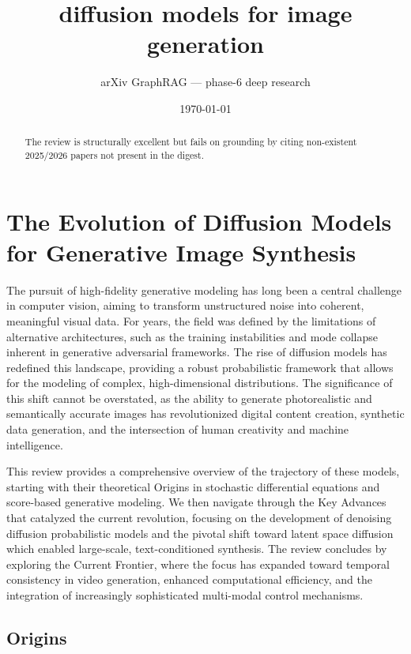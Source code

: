 \documentclass[11pt]{article}
\title{diffusion models for image generation}
\author{arXiv GraphRAG --- phase-6 deep research}
\date{\today}
\begin{document}
\maketitle

\begin{abstract}
The review is structurally excellent but fails on grounding by citing non-existent 2025/2026 papers not present in the digest.
\end{abstract}

\section{The Evolution of Diffusion Models for Generative Image Synthesis}

The pursuit of high-fidelity generative modeling has long been a central challenge in computer vision, aiming to transform unstructured noise into coherent, meaningful visual data. For years, the field was defined by the limitations of alternative architectures, such as the training instabilities and mode collapse inherent in generative adversarial frameworks. The rise of diffusion models has redefined this landscape, providing a robust probabilistic framework that allows for the modeling of complex, high-dimensional distributions. The significance of this shift cannot be overstated, as the ability to generate photorealistic and semantically accurate images has revolutionized digital content creation, synthetic data generation, and the intersection of human creativity and machine intelligence.

This review provides a comprehensive overview of the trajectory of these models, starting with their theoretical Origins in stochastic differential equations and score-based generative modeling. We then navigate through the Key Advances that catalyzed the current revolution, focusing on the development of denoising diffusion probabilistic models and the pivotal shift toward latent space diffusion which enabled large-scale, text-conditioned synthesis. The review concludes by exploring the Current Frontier, where the focus has expanded toward temporal consistency in video generation, enhanced computational efficiency, and the integration of increasingly sophisticated multi-modal control mechanisms.

\subsection{Origins}
\end{document}
